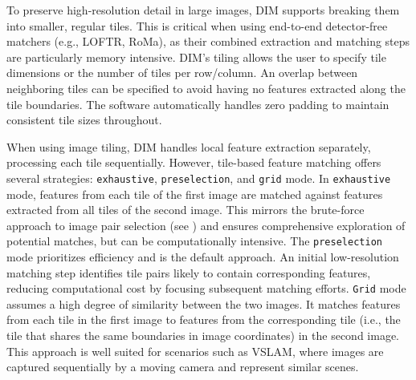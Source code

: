 To preserve high-resolution detail in large images, DIM supports breaking them into smaller, regular tiles.
This is critical when using end-to-end detector-free matchers (e.g., LOFTR, RoMa), as their combined extraction and matching steps are particularly memory intensive. 
DIM's tiling allows the user to specify tile dimensions or the number of tiles per row/column.
An overlap between neighboring tiles can be specified to avoid having no features extracted along the tile boundaries. 
The software automatically handles zero padding to maintain consistent tile sizes throughout. 

When using image tiling, DIM handles local feature extraction separately, processing each tile sequentially. 
However, tile-based feature matching offers several strategies: \texttt{exhaustive}, \texttt{preselection}, and \texttt{grid} mode.
In \texttt{exhaustive} mode, features from each tile of the first image are matched against features extracted from all tiles of the second image. 
This mirrors the brute-force approach to image pair selection (see ) and ensures comprehensive exploration of potential matches, but can be computationally intensive. 
The \texttt{preselection} mode prioritizes efficiency and is the default approach. 
An initial low-resolution matching step identifies tile pairs likely to contain corresponding features, reducing computational cost by focusing subsequent matching efforts. 
\texttt{Grid} mode assumes a high degree of similarity between the two images. 
It matches features from each tile in the first image to features from the corresponding tile (i.e., the tile that shares the same boundaries in image coordinates) in the second image. 
This approach is well suited for scenarios such as VSLAM, where images are captured sequentially by a moving camera and represent similar scenes. 

